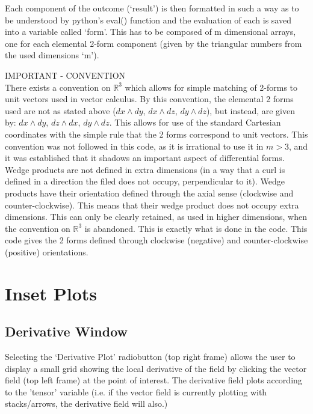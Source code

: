\documentclass[11]{report}
\begin{document}
Each component of the outcome (`result') is then formatted in such a way as to be understood by python's eval() function and the evaluation of each is saved into a variable called `form'. This has to be composed of m dimensional arrays, one for each elemental 2-form component (given by the triangular numbers from the used dimensions `m').

\begin{center}
	\Large
	IMPORTANT - CONVENTION\\
	\normalsize
	There exists a convention on $\mathbb{R}^{3}$ which allows for simple matching of 2-forms to unit vectors used in vector calculus. By this convention, the elemental 2 forms used are not as stated above ($ dx \wedge dy$, $ dx \wedge dz$, $ dy \wedge dz$), but instead, are given by: $dx \wedge dy$, $ dz \wedge dx$, $ dy \wedge dz$. This allows for use of the standard Cartesian coordinates with the simple rule that the 2 forms correspond to unit vectors. This convention was not followed in this code, as it is irrational to use it in $m>3$, and it was established that it shadows an important aspect of differential forms. Wedge products are not defined in extra dimensions (in a way that a curl is defined in a direction the filed does not occupy, perpendicular to it). Wedge products have their orientation defined through the axial sense (clockwise and counter-clockwise). This means that their wedge product does not occupy extra dimensions. This can only be clearly retained, as used in higher dimensions, when the convention on $\mathbb{R}^{3}$ is abandoned. This is exactly what is done in the code. This code gives the 2 forms defined through clockwise (negative) and counter-clockwise (positive) orientations.
\end{center}

\section{Inset Plots}
\subsection{Derivative Window}
Selecting the `Derivative Plot' radiobutton (top right frame) allows the user to display a small grid showing the local derivative of the field by clicking the vector field (top left frame) at the point of interest. The derivative field plots according to the 'tensor' variable (i.e. if the vector field is currently plotting with stacks/arrows, the derivative field will also.)
\end{document}
